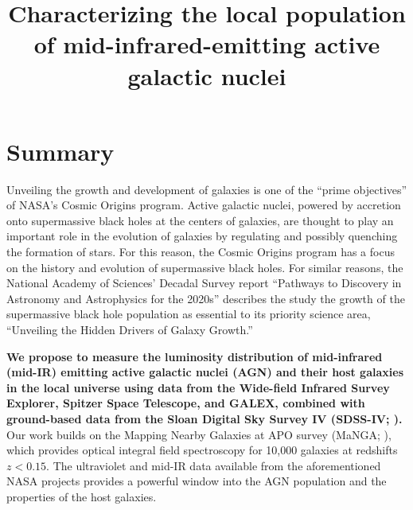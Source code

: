 \documentclass[12pt, preprint]{hacked-aastex}
\begin{document}
\pagestyle{plain}

\newcommand{\imtxt}[1]{\textcolor{red}{#1}}
\newcommand{\imsout}[1]{\textcolor{red}{\sout{#1}}}

\title{{\large Characterizing the local population of mid-infrared-emitting active galactic nuclei}}

\maketitle

\renewcommand{\baselinestretch}{0.75}\normalsize
{\hypersetup{hidelinks} \tableofcontents }
\renewcommand{\baselinestretch}{1.0}\normalsize


\newpage
\section{Summary}\label{sec:summary}

Unveiling the growth and development of galaxies is one of the ``prime
objectives'' of NASA's Cosmic Origins program.  Active galactic
nuclei, powered by accretion onto supermassive black holes at the
centers of galaxies, are thought to play an important role in the
evolution of galaxies by regulating and possibly quenching the
formation of stars.  For this reason, the Cosmic Origins program has a
focus on the history and evolution of supermassive black holes.  For
similar reasons, the National Academy of Sciences' Decadal Survey
report ``Pathways to Discovery in Astronomy and Astrophysics for the
2020s'' describes the study the growth of the supermassive black hole
population as essential to its priority science area, ``Unveiling the
Hidden Drivers of Galaxy Growth.''

{\bf We propose to measure the luminosity distribution of mid-infrared
  (mid-IR) emitting active galactic nuclei (AGN) and their host
  galaxies in the local universe using data from the Wide-field
  Infrared Survey Explorer, Spitzer Space Telescope, and GALEX,
  combined with ground-based data from the Sloan Digital Sky Survey IV
  (SDSS-IV; \cite{blanton17a}).}  Our work builds on the Mapping
Nearby Galaxies at APO survey (MaNGA; \cite{bundy15a}), which provides
optical integral field spectroscopy for 10,000 galaxies at redshifts
$z<0.15$.  The ultraviolet and mid-IR data available from the
aforementioned NASA projects provides a powerful window into the AGN
population and the properties of the host galaxies.
\end{document}
